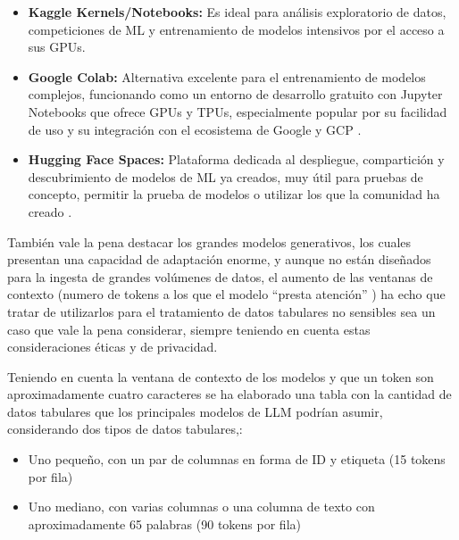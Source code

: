 \begin{itemize}
	\item \textbf{Kaggle Kernels/Notebooks:} Es ideal para análisis exploratorio de datos, competiciones de ML y entrenamiento de modelos intensivos \citep{Kaggle_CloudIA} por el acceso a sus GPUs.
	\item \textbf{Google Colab:} Alternativa excelente para el entrenamiento de modelos complejos, funcionando como un entorno de desarrollo gratuito con Jupyter Notebooks que ofrece GPUs y TPUs, especialmente popular por su facilidad de uso y su integración con el ecosistema de Google y GCP \citep{GoogleColab_CloudIA}.
	\item \textbf{Hugging Face Spaces:} Plataforma dedicada al despliegue, compartición y descubrimiento de modelos de ML ya creados, muy útil para pruebas de concepto, permitir la prueba de modelos o utilizar los que la comunidad ha creado \citep{huggingfaceSpaces_CloudIA}.
\end{itemize}

También vale la pena destacar los grandes modelos generativos, los cuales presentan una capacidad de adaptación enorme, y aunque no están diseñados para la ingesta de grandes volúmenes de datos, el aumento de las ventanas de contexto (numero de tokens a los que el modelo ``presta atención'' \citep{vaswani2017attention}) ha echo que tratar de utilizarlos para el tratamiento de datos tabulares no sensibles sea un caso que vale la pena considerar, siempre teniendo en cuenta estas consideraciones éticas y de privacidad.

Teniendo en cuenta la ventana de contexto de los modelos \citep{LLMLeaderboardParameters} y que un token son aproximadamente cuatro caracteres \citep{TokenizacionMicrosoft} se ha elaborado una tabla con la cantidad de datos tabulares que los principales modelos de LLM podrían asumir, considerando dos tipos de datos tabulares,:
\begin{itemize}
 	\item Uno pequeño, con un par de columnas en forma de ID y etiqueta (15 tokens por fila)
 	\item Uno mediano, con varias columnas o una columna de texto con aproximadamente 65 palabras (90 tokens por fila)
\end{itemize}

